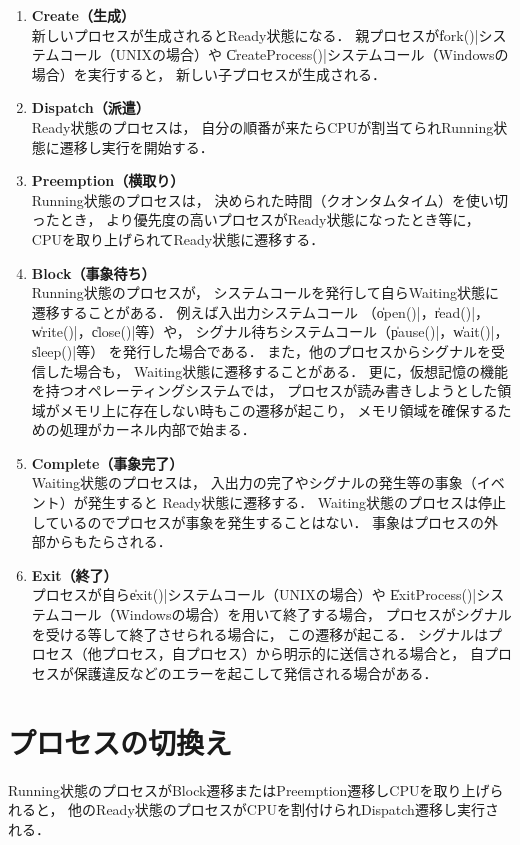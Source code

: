 \begin{enumerate}
\item {\bf Create（生成）} \\
新しいプロセスが生成されるとReady状態になる．
親プロセスが\|fork()|システムコール（UNIXの場合）や
\|CreateProcess()|システムコール（Windowsの場合）を実行すると，
新しい子プロセスが生成される．

\item {\bf Dispatch（派遣）} \\
Ready状態のプロセスは，
自分の順番が来たらCPUが割当てられRunning状態に遷移し実行を開始する．

\item {\bf Preemption（横取り）} \\
Running状態のプロセスは，
決められた時間（クオンタムタイム）を使い切ったとき，
より優先度の高いプロセスがReady状態になったとき等に，
CPUを取り上げられてReady状態に遷移する．

\item {\bf Block（事象待ち）} \\
Running状態のプロセスが，
システムコールを発行して自らWaiting状態に遷移することがある．
例えば入出力システムコール
（\|open()|，\|read()|，\|write()|，\|close()|等）や，
シグナル待ちシステムコール（\|pause()|，\|wait()|，\|sleep()|等）
を発行した場合である．
また，他のプロセスからシグナルを受信した場合も，
Waiting状態に遷移することがある．
更に，仮想記憶の機能を持つオペレーティングシステムでは，
プロセスが読み書きしようとした領域がメモリ上に存在しない時もこの遷移が起こり，
メモリ領域を確保するための処理がカーネル内部で始まる．

\item {\bf Complete（事象完了）} \\
Waiting状態のプロセスは，
入出力の完了やシグナルの発生等の事象（イベント）が発生すると
Ready状態に遷移する．
Waiting状態のプロセスは停止しているのでプロセスが事象を発生することはない．
事象はプロセスの外部からもたらされる．

\item {\bf Exit（終了）} \\
プロセスが自ら\|exit()|システムコール（UNIXの場合）や
\|ExitProcess()|システムコール（Windowsの場合）を用いて終了する場合，
プロセスがシグナルを受ける等して終了させられる場合に，
この遷移が起こる．
シグナルはプロセス（他プロセス，自プロセス）から明示的に送信される場合と，
自プロセスが保護違反などのエラーを起こして発信される場合がある．
\end{enumerate}

\section{プロセスの切換え}
Running状態のプロセスがBlock遷移またはPreemption遷移しCPUを取り上げられると，
他のReady状態のプロセスがCPUを割付けられDispatch遷移し実行される．

